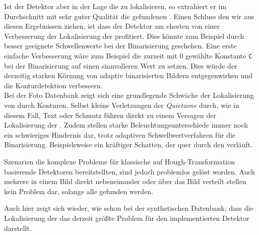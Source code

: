 Ist der Detektor aber in der Lage die \fps zu lokalisieren, so extrahiert er im Durchschnitt mit sehr guter Qualität die gefundenen \QRCodes.
Einen Schluss den wir aus diesen Ergebnissen ziehen, ist dass der Detektor am ehesten von einer Verbesserung der Lokalisierung der \fps profitiert. Dies könnte zum Beispiel durch besser geeignete Schwellenwerte bei der Binarisierung geschehen. Eine erste einfache Verbesserung wäre zum Beispiel die zurzeit mit $0$ gewählte Konstante \texttt{C} bei der Binarisierung auf einen sinnvolleren Wert zu setzen. Dies würde der derzeitig starken Körnung von adaptiv binarisierten Bildern entgegenwirken und die Konturdetektion verbessern.
\\
Bei der Foto Datenbank zeigt sich eine grundlegende Schwäche der Lokalisierung von \fps durch Konturen. Selbst kleine Verletzungen der \emph{Quietzone} durch, wie in diesem Fall, Text oder Schmutz führen direkt zu einem Versagen der Lokalisierung der \fps. Zudem stellen starke Beleuchtungsunterschiede immer noch ein schwieriges Hindernis dar, trotz adaptiven Schwellwertverfahren für die Binarisierung. Beispielsweise ein kräftiger Schatten, der quer durch den \QRCode verläuft.

Szenarien die komplexe Probleme für klassische auf Hough-Transformation basierende Detektoren bereitstellten, sind jedoch problemlos gelöst worden. Auch mehrere \QRCodes in einem Bild direkt nebeneinander oder über das Bild verteilt stellen kein Problem dar, solange alle \fps gefunden werden.

Auch hier zeigt sich wieder, wie schon bei der synthetischen Datenbank, dass die Lokalisierung der \fps das derzeit größte Problem für den implementierten Detektor darstellt.